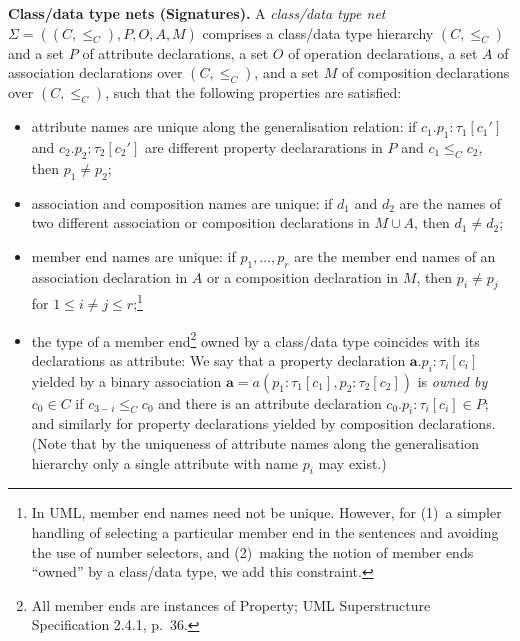 \documentclass[10pt,fleqn,%
\ifpretendfinal
final%
\else
draft%
\fi,
]{scrreprt}
\newcommand{\uml}[1]{\textsf{#1}}
\begin{document}
\medskip\noindent\textbf{Class/data type nets (Signatures).}
A \emph{class/data type net} $\Sigma = ((C, {\leq_C}), P, O, A, M)$
comprises a class/data type hierarchy $(C, {\leq_C})$ and a set $P$ of
attribute declarations, a set $O$ of operation declarations,
 a set $A$ of association declarations over
$(C, {\leq_C})$, and a set $M$ of composition declarations over $(C, {\leq_C})$, such that
the following properties are satisfied:
%
\begin{itemize}[label={--}, leftmargin=*]
  \item attribute names are unique along the generalisation relation: if
$c_1.p_1 : \tau_1[c_1']$ and $c_2.p_2 : \tau_2[c_2']$ are different
property declararations in $P$ and $c_1 \leq_C c_2$, then $p_1 \neq
p_2$;

  \item association and composition names are unique: if $d_1$ and
$d_2$ are the names of two different association or composition
declarations in $M \cup A$, then $d_1 \neq d_2$;

  \item member end names are unique: if $p_1, \ldots, p_r$ are the
member end names of an association declaration in $A$ or a composition
declaration in $M$, then $p_i \neq p_j$ for $1 \leq i \neq j \leq r$;\footnote{In UML, member end names need not
  be unique.  However, for (1)~a simpler handling of selecting a
  particular member end in the sentences and avoiding the use of
  number selectors, and (2)~making the notion of member ends ``owned''
  by a class/data type, we add this constraint.}

  \item the type of a member end\footnote{All member ends are instances
  of \uml{Property}; UML Superstructure Specification 2.4.1, p.~36.}
owned by a class/data type coincides with its declarations as attribute:
We say that a property declaration $\mathbf{a}.p_i : \tau_i[c_i]$
yielded by a binary association
$\mathbf{a} = a(p_1 : \tau_1[c_1], p_2 : \tau_2[c_2])$ is \emph{owned
  by} $c_0 \in C$ if $c_{3-i} \leq_C c_0$ and there is an attribute
declaration $c_0.p_i : \tau_i[c_i] \in P$; and similarly for property
declarations yielded by composition declarations.  (Note that by the
uniqueness of attribute names along the generalisation hierarchy only a
single attribute with name $p_i$ may exist.)
\end{itemize}
\end{document}
